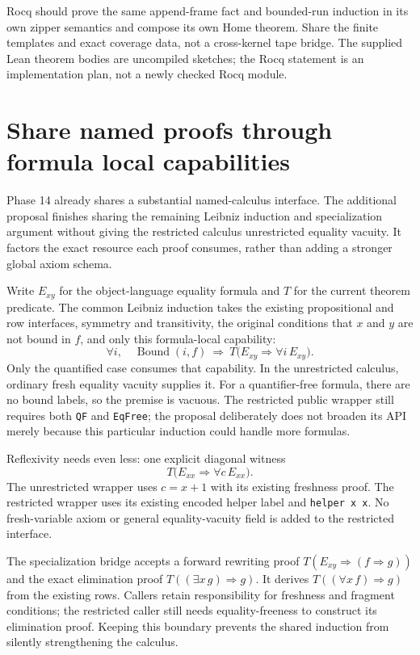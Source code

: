 \documentclass[11pt]{article}
\newcommand{\code}[1]{\texttt{#1}}
\begin{document}
Rocq should prove the same append-frame fact and bounded-run induction in its own zipper semantics and compose its own Home theorem. Share the finite templates and exact coverage data, not a cross-kernel tape bridge. The supplied Lean theorem bodies are uncompiled sketches; the Rocq statement is an implementation plan, not a newly checked Rocq module.

\section{Share named proofs through formula local capabilities}
Phase 14 already shares a substantial named-calculus interface. The additional proposal finishes sharing the remaining Leibniz induction and specialization argument without giving the restricted calculus unrestricted equality vacuity. It factors the exact resource each proof consumes, rather than adding a stronger global axiom schema.

Write $E_{xy}$ for the object-language equality formula and $T$ for the current theorem predicate. The common Leibniz induction takes the existing propositional and row interfaces, symmetry and transitivity, the original conditions that $x$ and $y$ are not bound in $f$, and only this formula-local capability:
\[
  \forall i,\quad \operatorname{Bound}(i,f)\ \Longrightarrow\
  T\bigl(E_{xy}\Rightarrow\forall i\,E_{xy}\bigr).
\]
Only the quantified case consumes that capability. In the unrestricted calculus, ordinary fresh equality vacuity supplies it. For a quantifier-free formula, there are no bound labels, so the premise is vacuous. The restricted public wrapper still requires both \code{QF} and \code{EqFree}; the proposal deliberately does not broaden its API merely because this particular induction could handle more formulas.

Reflexivity needs even less: one explicit diagonal witness
\[
  T\bigl(E_{xx}\Rightarrow\forall c\,E_{xx}\bigr).
\]
The unrestricted wrapper uses $c=x+1$ with its existing freshness proof. The restricted wrapper uses its existing encoded helper label and \code{helper x x}. No fresh-variable axiom or general equality-vacuity field is added to the restricted interface.

The specialization bridge accepts a forward rewriting proof
$T(E_{xy}\Rightarrow(f\Rightarrow g))$ and the exact elimination proof
$T((\exists x\,g)\Rightarrow g)$. It derives $T((\forall x\,f)\Rightarrow g)$ from the existing rows. Callers retain responsibility for freshness and fragment conditions; the restricted caller still needs equality-freeness to construct its elimination proof. Keeping this boundary prevents the shared induction from silently strengthening the calculus.
\end{document}
